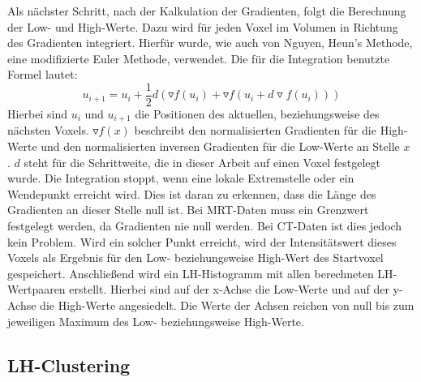Als nächster Schritt, nach der Kalkulation der Gradienten, folgt die Berechnung der Low- und High-Werte. Dazu wird für jeden Voxel im Volumen in Richtung des Gradienten integriert. Hierfür wurde, wie auch von Nguyen, Heun's Methode, eine modifizierte Euler Methode, verwendet. Die für die Integration benutzte Formel lautet:
\begin{equation}
	u_{i+1} = u_{i} + \frac{1}{2}d(\triangledown f (u_{i}) + \triangledown f(u_{i}+d \triangledown f(u_{i}))) 
\end{equation}
Hierbei sind $u_{i}$ und $u_{i+1}$ die Positionen des aktuellen, beziehungsweise des nächsten Voxels. $\triangledown f(x)$ beschreibt den normalisierten Gradienten für die High-Werte und den normalisierten inversen Gradienten für die Low-Werte an Stelle $x$ . $d$ steht für die Schrittweite, die in dieser Arbeit auf einen Voxel festgelegt wurde.
Die Integration stoppt, wenn eine lokale Extremstelle oder ein Wendepunkt erreicht wird. Dies ist daran zu erkennen, dass die Länge des Gradienten an dieser Stelle null ist. Bei MRT-Daten muss ein Grenzwert festgelegt werden, da Gradienten nie null werden. Bei CT-Daten ist dies jedoch kein Problem. Wird ein solcher Punkt erreicht, wird der Intensitätswert dieses Voxels als Ergebnis für den Low- beziehungsweise High-Wert des Startvoxel gespeichert.
\newline
Anschließend wird ein LH-Histogramm mit allen berechneten LH-Wertpaaren erstellt. Hierbei sind auf der x-Achse die Low-Werte und auf der y-Achse die High-Werte angesiedelt. Die Werte der Achsen reichen von null bis zum jeweiligen Maximum des Low- beziehungsweise High-Werte.

\subsection{LH-Clustering}

